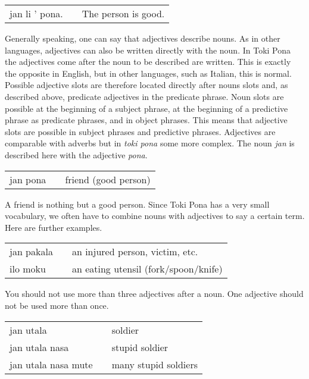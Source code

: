 \begin{supertabular}{p{5,5cm}|ll}
    jan li ' pona. &  & The person is good. \\
\end{supertabular}

Generally speaking, one can say that adjectives describe nouns.
As in other languages, adjectives can also be written directly with the noun.
In Toki Pona the adjectives come after the noun to be described are written.
This is exactly the opposite in English, but in other languages, such as Italian, this is normal.
Possible adjective slots are therefore located directly after nouns slots and, as described above, predicate adjectives in the predicate phrase.
Noun slots are possible at the beginning of a subject phrase, at the beginning of a predictive phrase as predicate phrases, and in object phrases.
This means that adjective slots are possible in subject phrases and predictive phrases.
Adjectives are comparable with adverbs but in \textit{toki pona} some more complex.
The noun \textit{jan} is described here with the adjective \textit{pona}.

\begin{supertabular}{p{5,5cm}|ll}
    jan pona &  & friend (good person) \\
\end{supertabular}

A friend is nothing but a good person.
Since Toki Pona has a very small vocabulary, we often have to combine nouns with adjectives to say a certain term.
Here are further examples.

\begin{supertabular}{p{5,5cm}|ll}
    jan pakala &  & an injured person, victim, etc.      \\
    ilo moku   &  & an eating utensil (fork/spoon/knife) \\
\end{supertabular}

You should not use more than three adjectives after a noun.
One adjective should not be used more than once.

\begin{supertabular}{p{5,5cm}|ll}
    jan utala           &  & soldier              \\
    jan utala nasa      &  & stupid soldier       \\
    jan utala nasa mute &  & many stupid soldiers \\
\end{supertabular}

